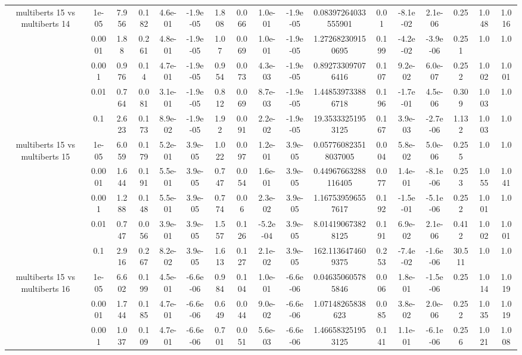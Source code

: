 \begin{tabular}{|c|c|c|c|c|c|c|c|c|c|c|c|c|c|c|c|c|}
\hline
\multirow{5}{*}{multiberts 15 vs multiberts 14} & 1e-05 & 7.956 & 0.182 & 4.6e-01 & -1.9e-05 & 1.808 & 0.066 & 1.0e-01 & -1.9e-05 & 0.08397264033555901 & 0.01 & -8.1e-02 & 2.1e-06 & 0.25 & 1.048 & 1.016 \\
 & 0.0001 & 1.88 & 0.261 & 4.8e-01 & -1.9e-05 & 1.07 & 0.069 & 1.0e-01 & -1.9e-05 & 1.272682309150695 & 0.199 & -4.2e-02 & -3.9e-06 & 0.251 & 1.0 & 1.0 \\
 & 0.001 & 0.976 & 0.14 & 4.7e-01 & -1.9e-05 & 0.954 & 0.073 & 4.3e-03 & -1.9e-05 & 0.892733097076416 & 0.107 & 9.2e-02 & 6.0e-07 & 0.252 & 1.002 & 1.001 \\
 & 0.01 & 0.764 & 0.081 & 3.1e-01 & -1.9e-05 & 0.812 & 0.069 & 8.7e-03 & -1.9e-05 & 1.448539733886718 & 0.196 & -1.7e-01 & 4.5e-06 & 0.309 & 1.003 & 1.0 \\
 & 0.1 & 2.623 & 0.173 & 8.9e-02 & -1.9e-05 & 1.92 & 0.091 & 2.2e-02 & -1.9e-05 & 19.35333251953125 & 0.167 & 3.9e-03 & -2.7e-06 & 1.132 & 1.003 & 1.0 \\
\hline
\multirow{5}{*}{multiberts 15 vs multiberts 15} & 1e-05 & 6.059 & 0.179 & 5.2e-01 & 3.9e-05 & 1.022 & 0.097 & 1.2e-01 & 3.9e-05 & 0.057760823518037005 & 0.004 & 5.8e-02 & 5.0e-06 & 0.255 & 1.0 & 1.0 \\
 & 0.0001 & 1.644 & 0.191 & 5.5e-01 & 3.9e-05 & 0.747 & 0.054 & 1.6e-01 & 3.9e-05 & 0.44967663288116405 & 0.077 & 1.4e-01 & -8.1e-06 & 0.253 & 1.055 & 1.041 \\
 & 0.001 & 1.288 & 0.148 & 5.5e-01 & 3.9e-05 & 0.774 & 0.06 & 2.3e-02 & 3.9e-05 & 1.167539596557617 & 0.192 & -1.5e-01 & -5.1e-06 & 0.252 & 1.001 & 1.0 \\
 & 0.01 & 0.747 & 0.056 & 3.9e-01 & 3.9e-05 & 1.557 & 0.126 & -5.2e-04 & 3.9e-05 & 8.014190673828125 & 0.191 & 6.9e-02 & 2.1e-06 & 0.412 & 1.002 & 1.001 \\
 & 0.1 & 2.916 & 0.267 & 8.2e-02 & 3.9e-05 & 1.613 & 0.127 & 2.1e-02 & 3.9e-05 & 162.1136474609375 & 0.253 & -7.4e-02 & -1.6e-06 & 30.511 & 1.0 & 1.0 \\
\hline
\multirow{5}{*}{multiberts 15 vs multiberts 16} & 1e-05 & 6.602 & 0.199 & 4.5e-01 & -6.6e-06 & 0.984 & 0.104 & 1.0e-01 & -6.6e-06 & 0.046350605785846 & 0.006 & 1.8e-01 & -1.5e-06 & 0.25 & 1.014 & 1.019 \\
 & 0.0001 & 1.744 & 0.185 & 4.7e-01 & -6.6e-06 & 0.649 & 0.044 & 9.0e-02 & -6.6e-06 & 1.07148265838623 & 0.085 & 3.8e-02 & 2.0e-06 & 0.252 & 1.035 & 1.019 \\
 & 0.001 & 1.037 & 0.109 & 4.7e-01 & -6.6e-06 & 0.701 & 0.051 & 5.6e-03 & -6.6e-06 & 1.466583251953125 & 0.141 & 1.1e-01 & -6.1e-06 & 0.256 & 1.021 & 1.008 \\

\end{tabular}

